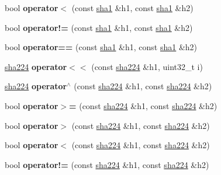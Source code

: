 \begin{DoxyCompactItemize}
bool {\bfseries operator$<$} (const \mbox{\hyperlink{classfc_1_1sha1}{sha1}} \&h1, const \mbox{\hyperlink{classfc_1_1sha1}{sha1}} \&h2)
\item 
\mbox{\label{namespacefc_a4c17c5dcd9d564e0be9f8797cbd8be8a}} 
bool {\bfseries operator!=} (const \mbox{\hyperlink{classfc_1_1sha1}{sha1}} \&h1, const \mbox{\hyperlink{classfc_1_1sha1}{sha1}} \&h2)
\item 
\mbox{\label{namespacefc_a2555f5494e8cd3436d1b96f441b32be6}} 
bool {\bfseries operator==} (const \mbox{\hyperlink{classfc_1_1sha1}{sha1}} \&h1, const \mbox{\hyperlink{classfc_1_1sha1}{sha1}} \&h2)
\item 
\mbox{\label{namespacefc_abf089cbc95af0b413505950191aeecfa}} 
\mbox{\hyperlink{classfc_1_1sha224}{sha224}} {\bfseries operator$<$$<$} (const \mbox{\hyperlink{classfc_1_1sha224}{sha224}} \&h1, uint32\+\_\+t i)
\item 
\mbox{\label{namespacefc_aa0bfdc9e52221382628c9269f0422634}} 
\mbox{\hyperlink{classfc_1_1sha224}{sha224}} {\bfseries operator$^\wedge$} (const \mbox{\hyperlink{classfc_1_1sha224}{sha224}} \&h1, const \mbox{\hyperlink{classfc_1_1sha224}{sha224}} \&h2)
\item 
\mbox{\label{namespacefc_a7055a53f618d6cfe7bcbfa60c90659d5}} 
bool {\bfseries operator$>$=} (const \mbox{\hyperlink{classfc_1_1sha224}{sha224}} \&h1, const \mbox{\hyperlink{classfc_1_1sha224}{sha224}} \&h2)
\item 
\mbox{\label{namespacefc_a64cf582b0e40a8ea5da2c119153e764c}} 
bool {\bfseries operator$>$} (const \mbox{\hyperlink{classfc_1_1sha224}{sha224}} \&h1, const \mbox{\hyperlink{classfc_1_1sha224}{sha224}} \&h2)
\item 
\mbox{\label{namespacefc_a90ec6138cd762e5361b5a9ae1c0ca640}} 
bool {\bfseries operator$<$} (const \mbox{\hyperlink{classfc_1_1sha224}{sha224}} \&h1, const \mbox{\hyperlink{classfc_1_1sha224}{sha224}} \&h2)
\item 
\mbox{\label{namespacefc_a3f7b87ebda51c3d16203194f210c2393}} 
bool {\bfseries operator!=} (const \mbox{\hyperlink{classfc_1_1sha224}{sha224}} \&h1, const \mbox{\hyperlink{classfc_1_1sha224}{sha224}} \&h2)

\end{DoxyCompactItemize}
